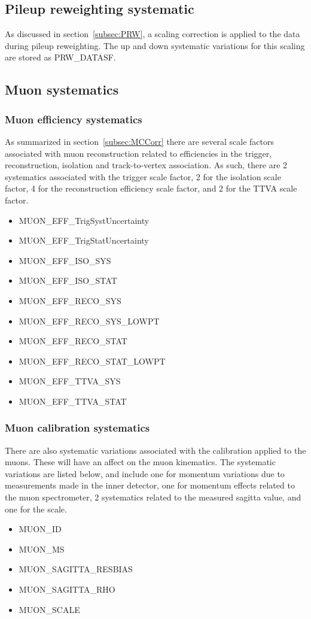 \subsection{Pileup reweighting systematic}
As discussed in section~\ref{subsec:PRW}, a scaling correction is applied to the data during pileup reweighting. The up and down systematic variations for this scaling are
stored as PRW\_DATASF.

\subsection{Muon systematics}

\subsubsection{Muon efficiency systematics}
As summarized in section~\ref{subsec:MCCorr} there are several scale factors associated with muon reconstruction related to efficiencies in the trigger, reconstruction, isolation and track-to-vertex association.
As such, there are 2 systematics associated with the trigger scale factor, 2 for the isolation scale factor, 4 for the reconstruction efficiency scale factor, and 2 for the TTVA scale factor.
\begin{itemize}
  \item MUON\_EFF\_TrigSystUncertainty
  \item MUON\_EFF\_TrigStatUncertainty
  \item MUON\_EFF\_ISO\_SYS
  \item MUON\_EFF\_ISO\_STAT
  \item MUON\_EFF\_RECO\_SYS
  \item MUON\_EFF\_RECO\_SYS\_LOWPT
  \item MUON\_EFF\_RECO\_STAT
  \item MUON\_EFF\_RECO\_STAT\_LOWPT
  \item MUON\_EFF\_TTVA\_SYS
  \item MUON\_EFF\_TTVA\_STAT
\end{itemize}

\subsubsection{Muon calibration systematics}
There are also systematic variations associated with the calibration applied to the muons. These will have an affect on the muon kinematics. The systematic variations are listed below, and include
one for momentum variations due to measurements made in the inner detector, one for momentum effects related to the muon spectrometer, 2 systematics related to the measured sagitta value, and one for the
scale.
\begin{itemize}
  \item MUON\_ID
  \item MUON\_MS
  \item MUON\_SAGITTA\_RESBIAS
  \item MUON\_SAGITTA\_RHO
  \item MUON\_SCALE
\end{itemize}

